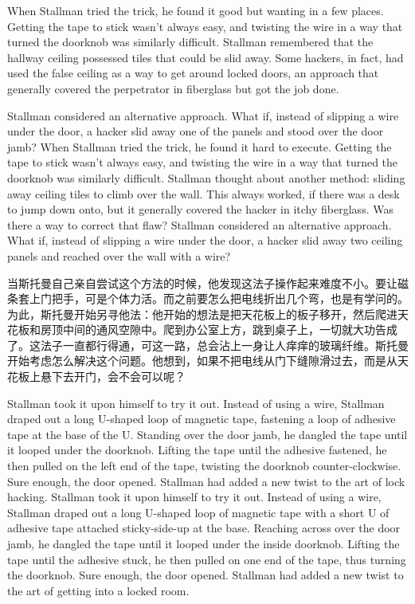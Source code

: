 \ifdefined\eng
\ifdefined\vone
When Stallman tried the trick, he found it good but wanting in a few places. Getting the tape to stick wasn't always easy, and twisting the wire in a way that turned the doorknob was similarly difficult. Stallman remembered that the hallway ceiling possessed tiles that could be slid away. Some hackers, in fact, had used the false ceiling as a way to get around locked doors, an approach that generally covered the perpetrator in fiberglass but got the job done.

Stallman considered an alternative approach. What if, instead of slipping a wire under the door, a hacker slid away one of the panels and stood over the door jamb?
\fi
\ifdefined\vtwo
When Stallman tried the trick, he found it hard to execute. Getting the tape to stick wasn't always easy, and twisting the wire in a way that turned the doorknob was similarly difficult. Stallman thought about another method: sliding away ceiling tiles to climb over the wall. This always worked, if there was a desk to jump down onto, but it generally covered the hacker in itchy fiberglass.  Was there a way to correct that flaw? Stallman considered an alternative approach. What if, instead of slipping a wire under the door, a hacker slid away two ceiling panels and reached over the wall with a wire?
\fi
\fi

\ifdefined\chs
当斯托曼自己亲自尝试这个方法的时候，他发现这法子操作起来难度不小。要让磁条套上门把手，可是个体力活。而之前要怎么把电线折出几个弯，也是有学问的。为此，斯托曼开始另寻他法：他开始的想法是把天花板上的板子移开，然后爬进天花板和房顶中间的通风空隙中。爬到办公室上方，跳到桌子上，一切就大功告成了。这法子一直都行得通，可这一路，总会沾上一身让人痒痒的玻璃纤维。斯托曼开始考虑怎么解决这个问题。他想到，如果不把电线从门下缝隙滑过去，而是从天花板上悬下去开门，会不会可以呢？
\fi

\ifdefined\eng
\ifdefined\vone
Stallman took it upon himself to try it out. Instead of using a wire, Stallman draped out a long U-shaped loop of magnetic tape, fastening a loop of adhesive tape at the base of the U. Standing over the door jamb, he dangled the tape until it looped under the doorknob. Lifting the tape until the adhesive fastened, he then pulled on the left end of the tape, twisting the doorknob counter-clockwise. Sure enough, the door opened. Stallman had added a new twist to the art of lock hacking.
\fi
\ifdefined\vtwo
Stallman took it upon himself to try it out. Instead of using a wire, Stallman draped out a long U-shaped loop of magnetic tape with a short U of adhesive tape attached sticky-side-up at the base. Reaching across over the door jamb, he dangled the tape until it looped under the inside doorknob. Lifting the tape until the adhesive stuck, he then pulled on one end of the tape, thus turning the doorknob. Sure enough, the door opened. Stallman had added a new twist to the art of getting into a locked room.
\fi
\fi


